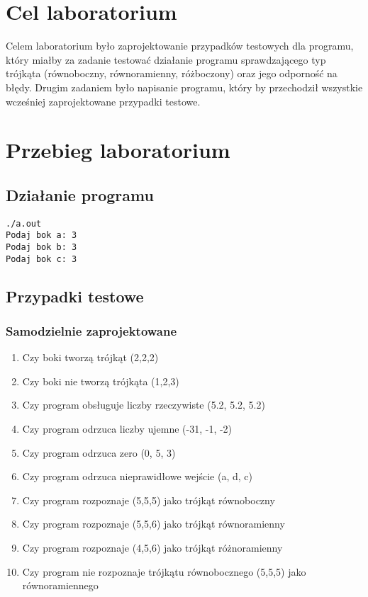 \documentclass{article}
\begin{document}

\newpage
\section{Cel laboratorium}
Celem laboratorium było zaprojektowanie przypadków testowych dla programu, który miałby za zadanie testować działanie programu sprawdzającego typ trójkąta (równoboczny, równoramienny, różboczony) oraz jego odporność na błędy. Drugim zadaniem było napisanie programu, który by przechodził wszystkie wcześniej zaprojektowane  przypadki testowe.

\section{Przebieg laboratorium}
\subsection{Działanie programu}

\begin{lstlisting}
./a.out 
Podaj bok a: 3
Podaj bok b: 3
Podaj bok c: 3
\end{lstlisting}

\subsection{Przypadki testowe}
\subsubsection{Samodzielnie zaprojektowane}
\begin{enumerate}
\item Czy boki tworzą trójkąt (2,2,2)
\item Czy boki nie tworzą trójkąta (1,2,3)
\item Czy program obsługuje liczby rzeczywiste (5.2, 5.2, 5.2)
\item Czy program odrzuca liczby ujemne (-31, -1, -2)
\item Czy program odrzuca zero (0, 5, 3)
\item Czy program odrzuca nieprawidłowe wejście (a, d, c)
\item Czy program rozpoznaje (5,5,5) jako trójkąt równoboczny
\item Czy program rozpoznaje (5,5,6) jako trójkąt równoramienny
\item Czy program rozpoznaje (4,5,6) jako trójkąt różnoramienny
\item Czy program nie rozpoznaje trójkątu równobocznego (5,5,5) jako równoramiennego

\end{enumerate}
\end{document}
